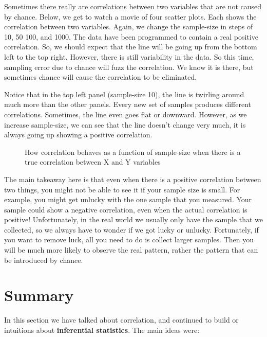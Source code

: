 \documentclass[
]{book}
\makeatletter
\newcommand*\pandocbounded[1]{%
  \sbox\pandoc@box{#1}%
  \Gscale@div\@tempa{\textheight}{\dimexpr\ht\pandoc@box+\dp\pandoc@box\relax}%
  \Gscale@div\@tempb{\linewidth}{\wd\pandoc@box}%
  \ifdim\@tempb\p@<\@tempa\p@\let\@tempa\@tempb\fi%
  \ifdim\@tempa\p@<\p@\scalebox{\@tempa}{\usebox\pandoc@box}%
  \else\usebox{\pandoc@box}%
  \fi%
}
\makeatother
\begin{document}
Sometimes there really are correlations between two variables that are not caused by chance. Below, we get to watch a movie of four scatter plots. Each shows the correlation between two variables. Again, we change the sample-size in steps of 10, 50 100, and 1000. The data have been programmed to contain a real positive correlation. So, we should expect that the line will be going up from the bottom left to the top right. However, there is still variability in the data. So this time, sampling error due to chance will fuzz the correlation. We know it is there, but sometimes chance will cause the correlation to be eliminated.

Notice that in the top left panel (sample-size 10), the line is twirling around much more than the other panels. Every new set of samples produces different correlations. Sometimes, the line even goes flat or downward. However, as we increase sample-size, we can see that the line doesn't change very much, it is always going up showing a positive correlation.

\begin{figure}
\centering
\pandocbounded{\texttt{[image: gifs/corRealgif-1.gif]}}
\caption{\label{fig:3realcorFour}How correlation behaves as a function of sample-size when there is a true correlation between X and Y variables}
\end{figure}

The main takeaway here is that even when there is a positive correlation between two things, you might not be able to see it if your sample size is small. For example, you might get unlucky with the one sample that you measured. Your sample could show a negative correlation, even when the actual correlation is positive! Unfortunately, in the real world we usually only have the sample that we collected, so we always have to wonder if we got lucky or unlucky. Fortunately, if you want to remove luck, all you need to do is collect larger samples. Then you will be much more likely to observe the real pattern, rather the pattern that can be introduced by chance.

\section{Summary}\label{summary-2}

In this section we have talked about correlation, and continued to build or intuitions about \textbf{inferential statistics}. The main ideas were:
\end{document}
